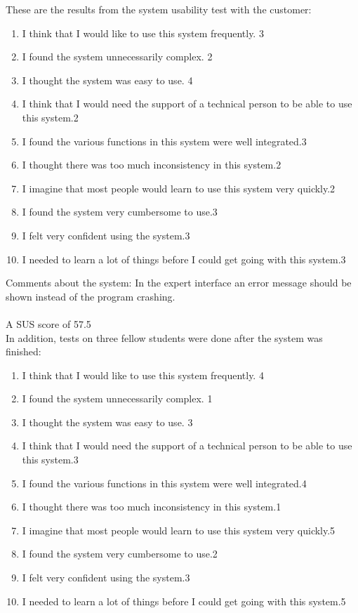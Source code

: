 These are the results from the system usability test with the customer:
\begin{enumerate} \setlength{\itemsep}{0cm}\setlength{\parskip}{0cm}
	\item I think that I would like to use this system frequently. \hfill 3 
	\item I found the system unnecessarily complex. \hfill 2
	\item I thought the system was easy to use. \hfill 4
	\item I think that I would need the support of a technical person to be able to use this system.\hfill 2
	\item I found the various functions in this system were well integrated.\hfill 3
	\item I thought there was too much inconsistency in this system.\hfill 2
	\item I imagine that most people would learn to use this system very quickly.\hfill 2
	\item I found the system very cumbersome to use.\hfill 3
	\item I felt very confident using the system.\hfill 3
	\item I needed to learn a lot of things before I could get going with this system.\hfill 3
\end{enumerate}
Comments about the system: In the expert interface an error message should be shown instead of the program crashing.\\ 
\\A SUS score of 57.5\\

In addition, tests on three fellow students were done after the system was finished:

\begin{enumerate} \setlength{\itemsep}{0cm}\setlength{\parskip}{0cm}
	\item I think that I would like to use this system frequently. \hfill 4
	\item I found the system unnecessarily complex. \hfill 1
	\item I thought the system was easy to use. \hfill 3
	\item I think that I would need the support of a technical person to be able to use this system.\hfill 3
	\item I found the various functions in this system were well integrated.\hfill 4
	\item I thought there was too much inconsistency in this system.\hfill 1
	\item I imagine that most people would learn to use this system very quickly.\hfill 5
	\item I found the system very cumbersome to use.\hfill 2
	\item I felt very confident using the system.\hfill 3
	\item I needed to learn a lot of things before I could get going with this system.\hfill 5
\end{enumerate}

